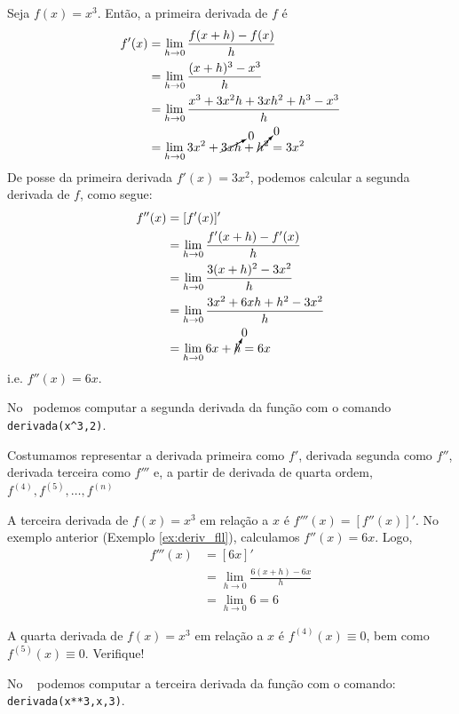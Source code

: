 \cleardoublepage\documentclass[../main.tex]{subfiles}
\begin{document}
\begin{ex}\label{ex:deriv_fll}
  Seja $f(x) = x^3$. Então, a primeira derivada de $f$ é
  \begin{align*}
    f'(x) &= \lim_{h\to 0} \frac{f(x+h)-f(x)}{h} \\
          &= \lim_{h\to 0} \frac{(x+h)^3-x^3}{h}\\
          &= \lim_{h\to 0} \frac{x^3+3x^2h+3xh^2+h^3-x^3}{h}\\
          &= \lim_{h\to 0} 3x^2+\cancelto{0}{3xh}+\cancelto{0}{h^2} = 3x^2
  \end{align*}
  De posse da primeira derivada $f'(x) = 3x^2$, podemos calcular a segunda derivada de $f$, como segue:
  \begin{align*}
    f''(x) &= [f'(x)]' \\
           &= \lim_{h\to 0} \frac{f'(x+h)-f'(x)}{h} \\
           &= \lim_{h\to 0} \frac{3(x+h)^2-3x^2}{h} \\
           &= \lim_{h\to 0} \frac{3x^2+6xh+h^2-3x^2}{h} \\
           &= \lim_{h\to 0} 6x+\cancelto{0}{h} = 6x
  \end{align*}
  i.e. $f''(x) = 6x$.

  
  No \geogebra~podemos computar a segunda derivada da função com o comando \verb+derivada(x^3,2)+.
\end{ex}
\begin{obs}
  Costumamos representar a derivada primeira como $f'$, derivada segunda como $f''$, derivada terceira como $f'''$ e, a partir de derivada de quarta ordem, $f^{(4)}, f^{(5)}, \ldots, f^{(n)}$
\end{obs}

\begin{ex}
  A terceira derivada de $f(x) = x^3$ em relação a $x$ é $f'''(x) = [f''(x)]'$. No exemplo anterior (Exemplo \ref{ex:deriv_fll}), calculamos $f''(x) = 6x$. Logo,
    \begin{align*}
      f'''(x) &= [6x]' \\
              &= \lim_{h\to 0} \frac{6(x+h)-6x}{h} \\
              &= \lim_{h\to 0} 6 = 6
    \end{align*}

    A quarta derivada de $f(x) = x^3$ em relação a $x$ é $f^{(4)}(x) \equiv 0$, bem como $f^{(5)}(x) \equiv 0$. Verifique!
    
    No \geogebra~ podemos computar a terceira derivada da função com o comando: \verb+derivada(x**3,x,3)+.
\end{ex}
\end{document}
